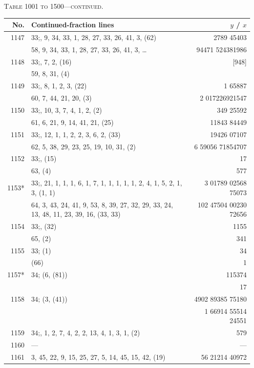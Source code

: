 \documentclass[11pt]{article}
\newcommand{\peheading}{%
  \begin{center}\small\textsc{Table 1001 to 1500---continued.}\end{center}
}
\begin{document}
\peheading
\renewcommand{\arraystretch}{1.15}
{\footnotesize
\begin{longtable}{|r|p{8.5cm}|r|}
\hline
\textbf{No.} & \textbf{Continued-fraction lines} & \textbf{$y$ \;/\; $x$}\\
\hline\endhead
1147   & $33$;\; 8, 9, 34, 33, 1, 28, 27, 33, 26, 41, 3, (62) & 2789 45403 \\
       & 58, 9, 34, 33, 1, 28, 27, 33, 26, 41, 3, \dots       & 94471 524381986 \\
\hline
1148   & $33$;\; 1, 7, 2, (16) & [948] \\
       & 59, 8, 31, (4) & \\
\hline
1149   & $33$;\; 1, 8, 1, 2, 3, (22) & 1 65887 \\
       & 60, 7, 44, 21, 20, (3) & 2 017226921547 \\
\hline
1150   & $33$;\; 1, 10, 3, 7, 4, 1, 2, (2) & 349 25592 \\
       & 61, 6, 21, 9, 14, 41, 21, (25) & 11843 84449 \\
\hline
1151   & $33$;\; 1, 12, 1, 1, 2, 2, 3, 6, 2, (33) & 19426 07107 \\
       & 62, 5, 38, 29, 23, 25, 19, 10, 31, (2) & 6 59056 71854707 \\
\hline
1152   & $33$;\; 1, (15) & 17 \\
       & 63, (4) & 577 \\
\hline
1153*  & $33$;\; 1, 21, 1, 1, 1, 6, 1, 7, 1, 1, 1, 1, 1, 2, 4, 1, 5, 2, 1, 3, (1, 1) & 3 01789 02568 75073 \\
       & 64, 3, 43, 24, 41, 9, 53, 8, 39, 27, 32, 29, 33, 24, 13, 48, 11, 23, 39, 16, (33, 33) & 102 47504 00230 72656 \\
\hline
1154   & $33$;\; 1, (32) & 1155 \\
       & 65, (2) & 341 \\
\hline
1155   & $33$;\; (1) & 34 \\
       & (66) & 1 \\
\hline
1157*  & $34$;\; (6, (81)) & 115374 \\
       & & 17 \\
\hline
1158   & $34$;\; (3, (41)) & 4902 89385 75180 \\
       & & 1 66914 55514 24551 \\
\hline
1159   & $34$;\; 22, 1, 2, 7, 4, 2, 2, 13, 4, 1, 3, 1, (2) & 579 \\
\hline
1160   & --- & --- \\
\hline
1161   & 3, 45, 22, 9, 15, 25, 27, 5, 14, 45, 15, 42, (19) & 56 21214 40972 \\

\end{longtable}}
\end{document}
